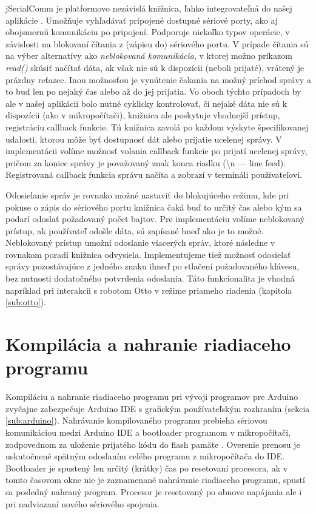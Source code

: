 jSerialComm je platformovo nezávislá knižnica, ľahko integrovateľná do našej aplikácie \cite{jSerialComm}. Umožňuje vyhľadávať pripojené dostupné sériové porty, ako aj obojsmernú komunikáciu po pripojení. Podporuje niekoľko typov operácie, v závislosti na blokovaní čítania z (zápisu do) sériového portu. V prípade čítania sú na výber alternatívy ako \textit{neblokovaná komunikácia}, v ktorej možno príkazom \textit{read()} skúsiť načítať dáta, ak však nie sú k dispozícii (neboli prijaté), vrátený je prázdny reťazec. Inou možnosťou je vynútenie čakania na možný príchod správy a to buď len po nejaký čas alebo až do jej prijatia. Vo oboch týchto prípadoch by ale v našej aplikácii bolo nutné cyklicky kontrolovať, či nejaké dáta nie sú k dispozícii (ako v mikropočítači), knižnica ale poskytuje vhodnejší prístup, registráciu callback funkcie. Tú knižnica zavolá po každom výskyte špecifikovanej udalosti, ktorou môže byť dostupnosť dát alebo prijatie ucelenej správy. V implementácii volíme možnosť volania callback funkcie po prijatí ucelenej správy, pričom za koniec správy je považovaný znak konca riadku (\textbackslash n --- line feed). Registrovaná callback funkcia správu načíta a zobrazí v termináli používateľovi.

Odosielanie správ je rovnako možné nastaviť do blokujúceho režimu, kde pri pokuse o zápis do sériového portu knižnica čaká buď to určitý čas alebo kým sa podarí odoslať požadovaný počet bajtov. Pre implementáciu volíme neblokovaný prístup, ak používateľ odošle dáta, sú zapísané hneď ako je to možné. Neblokovaný prístup umožní odoslanie viacerých správ, ktoré následne v rovnakom poradí knižnica odvysiela. Implementujeme tiež možnosť odosielať správy pozostávajúce z jedného znaku ihneď po stlačení požadovaného klávesu, bez nutnosti dodatočného potvrdenia odoslania. Táto funkcionalita je vhodná napríklad pri interakcii s robotom Otto v režime priameho riadenia (kapitola \ref{sub:otto}).


\section{Kompilácia a nahranie riadiaceho programu}
\label{sub:arduinoIDE}
Kompiláciu a nahranie riadiaceho programu pri vývoji programov pre Arduino zvyčajne zabezpečuje Arduino IDE s grafickým používateľským rozhraním (sekcia \ref{sub:arduino}). Nahrávanie kompilovaného programu prebieha sériovou komunikáciou medzi Arduino IDE a bootloader programom v mikropočítači, zodpovednom za uloženie prijatého kódu do flash pamäte \cite{sketchUpload}. Overenie prenosu je uskutočnené spätným odoslaním celého programu z mikropočítača do IDE. Bootloader je spustený len určitý (krátky) čas po resetovaní procesora, ak v tomto časovom okne nie je zaznamenané nahrávanie riadiaceho programu, spustí sa posledný nahraný program. Procesor je resetovaný po obnove napájania ale i pri nadviazaní nového sériového spojenia.

